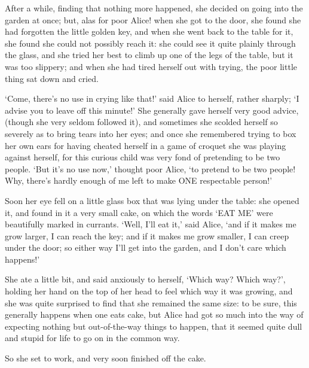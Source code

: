 \documentclass[12pt]{article}
\begin{document}
\begin{Parallel}[p]{}{}
{After a while, finding that nothing more happened, she decided on going into the garden at once; but, alas for poor Alice! when she got to the door, she found she had forgotten the little golden key, and when she went back to the table for it, she found she could not possibly reach it: she could see it quite plainly through the glass, and she tried her best to climb up one of the legs of the table, but it was too slippery; and when she had tired herself out with trying, the poor little thing sat down and cried.

‘Come, there’s no use in crying like that!’ said Alice to herself, rather sharply; ‘I advise you to leave off this minute!’ She generally gave herself very good advice, (though she very seldom followed it), and sometimes she scolded herself so severely as to bring tears into her eyes; and once she remembered trying to box her own ears for having cheated herself in a game of croquet she was playing against herself, for this curious child was very fond of pretending to be two people. ‘But it’s no use now,’ thought poor Alice, ‘to pretend to be two people! Why, there’s hardly enough of me left to make ONE respectable person!’

Soon her eye fell on a little glass box that was lying under the table: she opened it, and found in it a very small cake, on which the words ‘EAT ME’ were beautifully marked in currants. ‘Well, I’ll eat it,’ said Alice, ‘and if it makes me grow larger, I can reach the key; and if it makes me grow smaller, I can creep under the door; so either way I’ll get into the garden, and I don’t care which happens!’

She ate a little bit, and said anxiously to herself, ‘Which way? Which way?’, holding her hand on the top of her head to feel which way it was growing, and she was quite surprised to find that she remained the same size: to be sure, this generally happens when one eats cake, but Alice had got so much into the way of expecting nothing but out-of-the-way things to happen, that it seemed quite dull and stupid for life to go on in the common way.

So she set to work, and very soon finished off the cake.

\begin{center}
\quad*\quad*\quad*\quad*\quad*\quad*\quad*
\par
\quad*\quad*\quad*\quad*\quad*\quad*
\par
\quad*\quad*\quad*\quad*\quad*\quad*\quad*
\end{center}

}
\end{Parallel}
\end{document}
